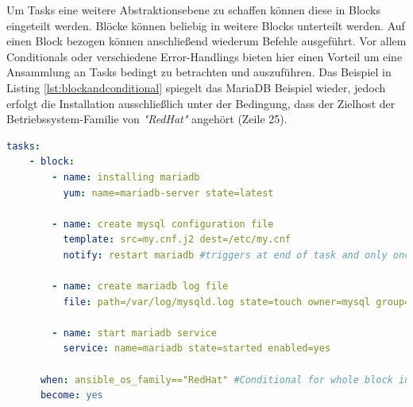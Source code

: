 \documentclass[biblatex]{lni}
\begin{document}
Um Tasks eine weitere Abstraktionsebene zu schaffen können diese in Blocks eingeteilt werden. Blöcke können beliebig in weitere Blocks unterteilt werden. Auf einen Block bezogen können anschließend wiederum Befehle ausgeführt. Vor allem Conditionals oder verschiedene Error-Handlings bieten hier einen Vorteil um eine Ansammlung an Tasks bedingt zu betrachten und auszuführen. Das Beispiel in Listing \ref{lst:blockandconditional} spiegelt das MariaDB Beispiel wieder, jedoch erfolgt die Installation ausschließlich unter der Bedingung, dass der Zielhost der Betriebssystem-Familie von \textit{"RedHat"} angehört (Zeile 25).
\begin{lstlisting}[language=yaml, caption={Das MariaDB Beispiel wird von einem Block umgeben, um ein Conditional auf alle enthaltenen Tasks zu beziehen}, label=lst:blockandconditional]
  tasks:
    - block:
        - name: installing mariadb
          yum: name=mariadb-server state=latest

        - name: create mysql configuration file
          template: src=my.cnf.j2 dest=/etc/my.cnf
          notify: restart mariadb #triggers at end of task and only once (multiple notifies possible)

        - name: create mariadb log file
          file: path=/var/log/mysqld.log state=touch owner=mysql group=mysql mode=0775

        - name: start mariadb service
          service: name=mariadb state=started enabled=yes

      when: ansible_os_family=="RedHat" #Conditional for whole block instead of each task
      become: yes
\end{lstlisting}
\end{document}
